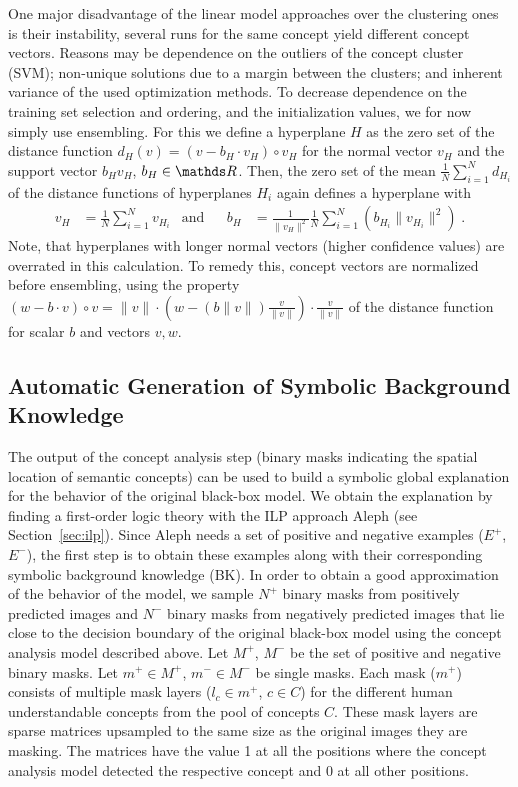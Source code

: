 One major disadvantage of the linear model approaches over the
clustering ones is their instability, \idest several runs for the same
concept yield different concept vectors.
Reasons may be dependence on the outliers of the concept cluster
(SVM); non-unique solutions due to a margin between the clusters;
and inherent variance of the used optimization methods.
To decrease dependence on the training set selection and ordering, and
the initialization values, we for now simply use ensembling.
For this we define a hyperplane $H$ as the zero set of the distance function
$d_H(v) = (v - b_H\cdot v_H) \circ v_H$
for the normal vector $v_H$ and the support vector $b_Hv_H$, $b_H\in\R$.
Then, the zero set of the mean
$\frac{1}{N} \sum_{i=1}^{N} d_{H_i}$ of the distance functions of
hyperplanes $H_i$ again defines a hyperplane with
\begin{align*}
  v_H &= \textstyle\frac{1}{N} \sum_{i=1}^{N} v_{H_i} &\text{and}&
  &b_H &= \textstyle\frac{1}{\|v_H\|^2} \frac{1}{N} \sum_{i=1}^{N} (b_{H_i}\|v_{H_i}\|^2) \;.
\end{align*}
Note, that hyperplanes with longer normal vectors (\idest higher
confidence values) are overrated in this calculation. To remedy this,
concept vectors are normalized before ensembling, using the property
$(w - b\cdot v) \circ v
= \|v\| \cdot (w - (b\|v\|)\frac{v}{\|v\|})\cdot \frac{v}{\|v\|}$
of the distance function for scalar $b$ and vectors $v, w$.


\subsection{Automatic Generation of Symbolic Background Knowledge}
\label{sec:bkextraction}

The output of the concept analysis step (binary masks indicating the
spatial location of semantic concepts) can be used to build a symbolic
global explanation for the behavior of the original black-box
model. We obtain the explanation by finding a first-order logic theory
with the ILP approach Aleph (see Section~\ref{sec:ilp}).
Since Aleph needs a set of positive and negative examples
($E^+$, $E^-$), the first step is to obtain these examples along with their
corresponding symbolic background knowledge (BK). In order to obtain a
good approximation of the behavior of the model, we sample $N^+$
binary masks from positively predicted images and $N^-$ binary masks
from negatively predicted images that lie close to the decision
boundary of the original black-box model using the concept analysis
model described above. Let $M^+$, $M^-$ be the set of positive and
negative binary masks. Let $m^+ \in M^+$, $m^- \in M^-$ be single
masks. Each mask (\forexample $m^+$) consists of multiple mask layers
(\forexample $l_c \in m^+$, $c \in C$) for the different human
understandable concepts from the pool of concepts $C$. These mask
layers are sparse matrices upsampled to the same size as the original
images they are masking. The matrices have the value 1 at all the
positions where the concept analysis model detected the respective
concept and 0 at all other positions.

